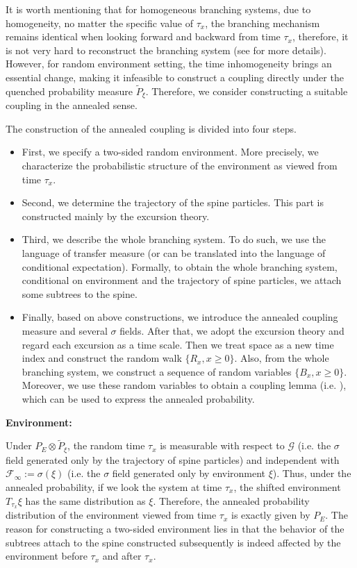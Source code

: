 \documentclass[]{article}
\numberwithin{equation}{section}
\theoremstyle{thmstyleone}%
\theoremstyle{thmstyletwo}%
\theoremstyle{thmstylethree}%
\theoremstyle{thmstylefour}%
\theoremstyle{thmstylefive}%
\theoremstyle{thmstylesix}%
\begin{document}
	It is worth mentioning that for homogeneous branching systems, due to homogeneity, 
	no matter  the specific value of $\tau_x$, the branching mechanism remains identical when looking forward and backward from time $\tau_x$, therefore,
	it is not very hard to reconstruct the branching system (see \cite{Fu2025} for more details).
	However, for random environment setting, the time inhomogeneity brings an essential change, making it infeasible to construct a coupling directly under the quenched probability measure $\tilde{P}_\xi$.
	Therefore, we consider constructing a suitable coupling in the annealed sense.
	
	
	The construction of the annealed coupling is divided into four steps. 
	
	\begin{itemize}
		\item First, we specify a two-sided random environment. More precisely, we characterize the probabilistic structure of the environment as viewed from time $\tau_x$.
		\item Second, we determine the trajectory of the spine particles. This part is constructed mainly by the excursion theory.
		\item Third, we describe the whole branching system. To do such, we use the language of transfer measure (or can be translated into the language of conditional expectation). Formally, to obtain the whole branching system, conditional on environment and the trajectory of spine particles, we attach some subtrees to the spine.
		\item Finally, based on above constructions, we introduce the annealed coupling measure and several $\sigma$ fields. After that, we adopt the excursion theory and regard each excursion as a time scale. Then we treat space as a new time index and construct the random walk $\{R_x,x\geqslant 0\}$. Also, from the whole branching system, we construct a sequence of random variables $ \{B_x,x\geqslant0\} $. Moreover, we use these random variables to obtain a coupling lemma (i.e. ), which can be used to express the annealed probability.
	\end{itemize}  
	
	\noindent\textbf{Environment:}
	
	
	Under $P_E\otimes \tilde{P}_\xi$, the random time $\tau_x$ is measurable with respect to $\mathcal{G}$ (i.e. the $\sigma$ field generated only by the trajectory of spine particles) and independent with $\mathcal{F}_\infty:=\sigma(\xi)$ (i.e. the $\sigma$ field generated only by environment $\xi $). Thus, under the annealed probability, if we look the system at time $\tau_x$, the shifted environment $T_{\tau_x}\xi$ has the same distribution as $\xi$. Therefore, the annealed probability distribution of the environment viewed from time $\tau_x$ is exactly given by $P_E$.
	The reason for constructing a two-sided environment lies in that the behavior of the subtrees attach to the spine constructed subsequently is indeed affected by the environment before $\tau_x$ and after $\tau_x$.
	
\end{document}

